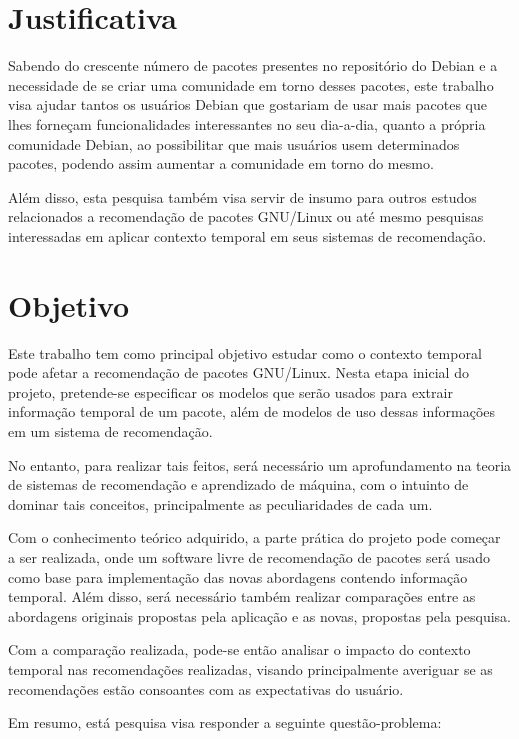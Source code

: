 \section{Justificativa}

Sabendo do crescente número de pacotes presentes no repositório do Debian e a
necessidade de se criar uma comunidade em torno desses pacotes, este trabalho
visa ajudar tantos os usuários Debian que gostariam de usar mais pacotes que
lhes forneçam funcionalidades interessantes no seu dia-a-dia, quanto a própria
comunidade Debian, ao possibilitar que mais usuários usem determinados pacotes,
podendo assim aumentar a comunidade em torno do mesmo.

Além disso, esta pesquisa também visa servir de insumo para outros estudos
relacionados a recomendação de pacotes GNU/Linux ou até mesmo pesquisas
interessadas em aplicar contexto temporal em seus sistemas de recomendação.

\section{Objetivo}

Este trabalho tem como principal objetivo estudar como o contexto temporal pode
afetar a recomendação de pacotes GNU/Linux. Nesta etapa inicial do projeto,
pretende-se especificar os modelos que serão usados para extrair informação
temporal de um pacote, além de modelos de uso dessas informações em um sistema
de recomendação.

No entanto, para realizar tais feitos, será necessário um aprofundamento na
teoria de sistemas de recomendação e aprendizado de máquina, com o intuinto de
dominar tais conceitos, principalmente as peculiaridades de cada um.

Com o conhecimento teórico adquirido, a parte prática do projeto pode começar a
ser realizada, onde um software livre de recomendação de pacotes será usado como
base para implementação das novas abordagens contendo informação temporal. Além
disso, será necessário também realizar comparações entre as abordagens originais
propostas pela aplicação e as novas, propostas pela pesquisa.

Com a comparação realizada, pode-se então analisar o impacto do contexto
temporal nas recomendações realizadas, visando principalmente averiguar se as
recomendações estão consoantes com as expectativas do usuário.

Em resumo, está pesquisa visa responder a seguinte questão-problema:

